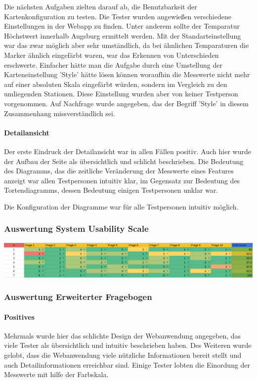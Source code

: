         Die nächsten Aufgaben zielten darauf ab, die Benutzbarkeit der Kartenkonfiguration zu testen. Die Tester wurden angewießen verschiedene Einstellungen in der Webapp zu finden. Unter anderem sollte der Temparatur Höchstwert innerhalb Augsburg ermittelt werden. Mit der Standarteinstellung war das zwar möglich aber sehr umständlich, da bei ähnlichen Temparaturen die Marker ähnlich eingefärbt waren, war das Erkennen von Unterschieden erschwerte.
        Einfacher hätte man die Aufgabe durch eine Umstellung der Karteneinstellung 'Style' hätte lösen können woraufhin die Messwerte nicht mehr auf einer absoluten Skala eingefärbt würden, sondern im Vergleich zu den umliegenden Stationen. Diese Einstellung wurden aber von keiner Testperson vorgenommen. Auf Nachfrage wurde angegeben, das der Begriff 'Style' in diesem Zusammenhang missverständlich sei.
     
      \paragraph{Detailansicht}
        Der erste Eindruck der Detailansicht war in allen Fällen positiv. Auch hier wurde der Aufbau der Seite als übersichtlich und schlicht beschrieben.
        Die Bedeutung des Diagramms, das die zeitliche Veränderung der Messwerte eines \glspl{Feature} anzeigt war allen Testpersonen intuitiv klar, im Gegensatz zur Bedeutung des Tortendiagramms, dessen Bedeutung einigen Testpersonen unklar war.
        
        Die Konfiguration der Diagramme war für alle Testpersonen intuitiv möglich.
     
    \subsubsection{Auswertung System Usability Scale}
      \includegraphics[width=1\linewidth]{figures/SUSscore.png}\par\vspace{1cm}

    \subsubsection{Auswertung Erweiterter Fragebogen}
      \paragraph{Positives}
        Mehrmals wurde hier das schlichte Design der Webanwendung angegeben, das viele Tester als übersichtlich und intuitiv beschrieben haben.
        Des Weiteren wurde gelobt, dass die Webanwendung viele nützliche Informationen bereit stellt und auch Detailinformationen erreichbar sind.
        Einige Tester lobten die Einordung der Messwerte mit hilfe der Farbskala.
     
